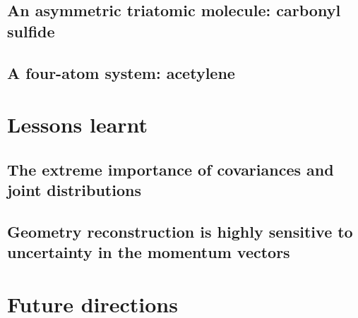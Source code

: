 \subsection{An asymmetric triatomic molecule: carbonyl sulfide}
\subsection{A four-atom system: acetylene}

\section{Lessons learnt}
\subsection{The extreme importance of covariances and joint distributions}
\subsection{Geometry reconstruction is highly sensitive to uncertainty in the momentum vectors}

\section{Future directions}